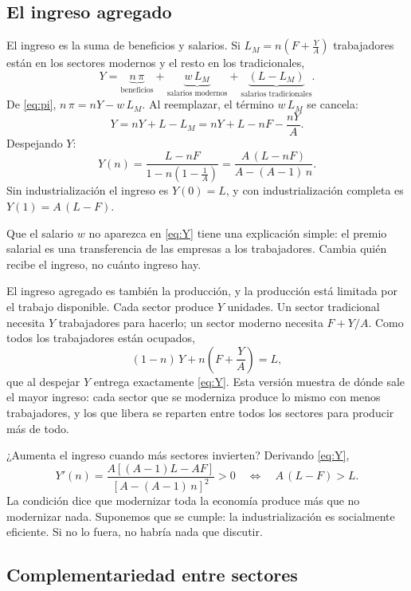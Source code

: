 \documentclass[12pt,letterpaper]{article}
\begin{document}
\subsection{El ingreso agregado}

El ingreso es la suma de beneficios y salarios. Si $L_M=n\left(F+\frac{Y}{A}\right)$ trabajadores están en los sectores modernos y el resto en los tradicionales,
\[
  Y=\underbrace{n\,\pi}_{\text{beneficios}}+\underbrace{w\,L_M}_{\text{salarios modernos}}+\underbrace{(L-L_M)}_{\text{salarios tradicionales}} .
\]
De \eqref{eq:pi}, $n\,\pi=nY-w\,L_M$. Al reemplazar, el término $w\,L_M$ se cancela:
\[
  Y=nY+L-L_M=nY+L-nF-\frac{nY}{A}.
\]
Despejando $Y$:
\begin{equation}\label{eq:Y}
  Y(n)=\frac{L-nF}{1-n\left(1-\frac{1}{A}\right)}=\frac{A\,(L-nF)}{A-(A-1)\,n} .
\end{equation}
Sin industrialización el ingreso es $Y(0)=L$, y con industrialización completa es $Y(1)=A\,(L-F)$.

Que el salario $w$ no aparezca en \eqref{eq:Y} tiene una explicación simple: el premio salarial es una transferencia de las empresas a los trabajadores. Cambia quién recibe el ingreso, no cuánto ingreso hay.

\begin{intuicion}
El ingreso agregado es también la producción, y la producción está limitada por el trabajo disponible. Cada sector produce $Y$ unidades. Un sector tradicional necesita $Y$ trabajadores para hacerlo; un sector moderno necesita $F+Y/A$. Como todos los trabajadores están ocupados,
\[
  (1-n)\,Y+n\left(F+\frac{Y}{A}\right)=L ,
\]
que al despejar $Y$ entrega exactamente \eqref{eq:Y}. Esta versión muestra de dónde sale el mayor ingreso: cada sector que se moderniza produce lo mismo con menos trabajadores, y los que libera se reparten entre todos los sectores para producir más de todo.
\end{intuicion}

¿Aumenta el ingreso cuando más sectores invierten? Derivando \eqref{eq:Y},
\[
  Y'(n)=\frac{A\left[(A-1)L-AF\right]}{\left[A-(A-1)\,n\right]^{2}}>0
  \quad\Longleftrightarrow\quad A\,(L-F)>L .
\]
La condición dice que modernizar toda la economía produce más que no modernizar nada. Suponemos que se cumple: la industrialización es socialmente eficiente. Si no lo fuera, no habría nada que discutir.

\subsection{Complementariedad entre sectores}
\end{document}
